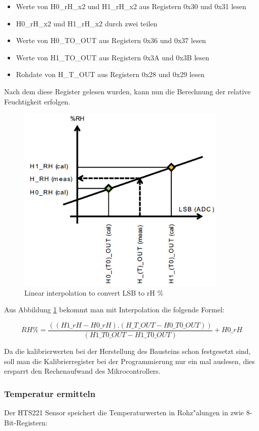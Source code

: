 \begin{itemize}
	\item Werte von H0\_rH\_x2 und H1\_rH\_x2 aus Registern 0x30 und 0x31 lesen 
	\item H0\_rH\_x2 und H1\_rH\_x2 durch zwei teilen
	\item Werte von H0\_TO\_OUT aus Registern 0x36 und 0x37 lesen 
	\item Werte von H1\_TO\_OUT aus Registern 0x3A und 0x3B lesen
	\item Rohdate von H\_T\_OUT aus Registern 0x28 und 0x29 lesen
\end{itemize}

Nach dem diese Register gelesen wurden, kann nun die Berechnung der relative Feuchtigkeit erfolgen. 

\begin{figure}[h]
	\centering
	\includegraphics[width=10cm]{source/images/rH}
	\caption{Linear interpolation to convert LSB to rH \% \cite{HTS221}}\label{graph:rH}
\end{figure}

Aus Abbildung \ref{graph:rH} bekommt man mit Interpolation die folgende Formel:

\[
RH\% = \frac{((H1\_rH - H0\_rH) . (H\_T\_OUT - H0\_T0\_OUT))}{(H1\_T0\_OUT - H1\_T0\_OUT) } + H0\_rH 
\]

Da die kalibrierwerten bei der Herstellung des Bausteins schon festgesetzt sind, soll man die Kalibrierregister bei der Programmierung nur ein mal auslesen, dies ersparrt den Rechenaufwand des Mikrocontrollers. 

\subsubsection{Temperatur ermitteln}
Der HTS221 Sensor speichert die Temperaturwerten in Rohz"alungen in zwie 8-Bit-Registern:

